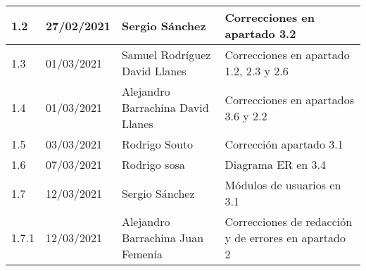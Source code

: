 \documentclass[12pt]{article}
\begin{document}
\begin{tabularx}{\textwidth}{ |l|l|p{5cm}|X| }
	\hline
	1.2              & 27/02/2021     & Sergio Sánchez                                                                                                           & Correcciones en apartado 3.2                         \\
	\hline
	1.3              & 01/03/2021     & Samuel Rodríguez \newline David Llanes                                                                                   & Correcciones en apartado 1.2, 2.3 y 2.6              \\
	\hline
	1.4              & 01/03/2021     & Alejandro Barrachina \newline David Llanes                                                                               & Correcciones en apartados 3.6 y 2.2                  \\
	\hline
	1.5              & 03/03/2021     & Rodrigo Souto                                                                                                            & Corrección apartado 3.1                              \\
	\hline
	1.6              & 07/03/2021     & Rodrigo sosa                                                                                                             & Diagrama ER en 3.4                                   \\
	\hline
	1.7              & 12/03/2021     & Sergio Sánchez                                                                                                           & Módulos de usuarios en 3.1                           \\
	\hline
	1.7.1            & 12/03/2021     & Alejandro Barrachina \newline Juan Femenía                                                                               & Correcciones de redacción y de errores en apartado 2 \\
	\hline
\end{tabularx}

\newpage
\tableofcontents
\newpage


\newpage

\newpage

\end{document}
